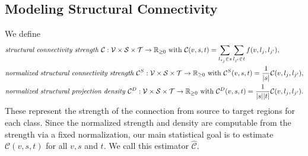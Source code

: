 
\newpage

\subsection{Modeling Structural Connectivity}
We define
\begin{align*}
&\text{\textit {structural connectivity strength} } \mathcal C : \mathcal V \times \mathcal S \times \mathcal T \to \mathbb R_{\geq 0}  \text{ with } \mathcal C(v,s,t) = \sum_{l_{s_j} \in s} \sum_{l_{j'} \in  t} f(v,l_{j},l_{j'}), \\
&\text{\textit {normalized structural connectivity strength} } \mathcal C^S : \mathcal V \times \mathcal S \times \mathcal T \to \mathbb R_{\geq 0}  \text{ with } \mathcal C^S(v,s,t) = \frac{1}{|s|} \mathcal C(v,l_{j},l_{j'}), \\
&\text{\textit {normalized structural projection density} } \mathcal C^D : \mathcal V \times \mathcal S \times \mathcal T \to \mathbb R_{\geq 0} \text{ with } \mathcal C^D(v,s,t) = \frac{1}{| s | | t|}\mathcal C(v,l_{j},l_{j'}).
\end{align*}
These represent the strength of the connection from source to target regions for each class.
Since the normalized strength and density are computable from the strength via a fixed normalization, our main statistical goal is to estimate $\mathcal C (v,s,t) $ for all $v, s$ and $t$.%
We call this estimator $\widehat { \mathcal C } $.

